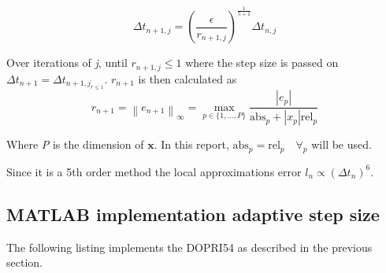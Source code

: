 \begin{equation}
\Delta t_{n+1, j}=\left(\frac{\epsilon}{r_{n+1, j}}\right)^{\frac{1}{5+1}} \Delta t_{n, j}
\end{equation}

Over iterations of \textit{j}, until $r_{n+1, j} \leq 1$ where the step size is passed on $\Delta t_{n+1} = \Delta t_{n+1, j_{r\leq1}}$. $r_{n+1}$ is then calculated as
\begin{equation}
    r_{n+1} = \left\|e_{n+1}\right\|_\infty = \max _{p \in\{1, \ldots, P\}} \frac{\left|e_{p}\right|}{\mathrm{abs}_{p}+\left|x_{p}\right| \mathrm{rel}_{p}}
\end{equation}

Where \textit{P} is the dimension of $\boldsymbol{x}$. In this report, $\mathrm{abs}_p = \mathrm{rel}_p \quad \forall_p$ will be used.




Since it is a 5th order method the local approximations error $l_n \propto (\Delta t_n)^{6}$.

\subsection{MATLAB implementation adaptive step size}
The following listing implements the DOPRI54 as described in the previous section.

